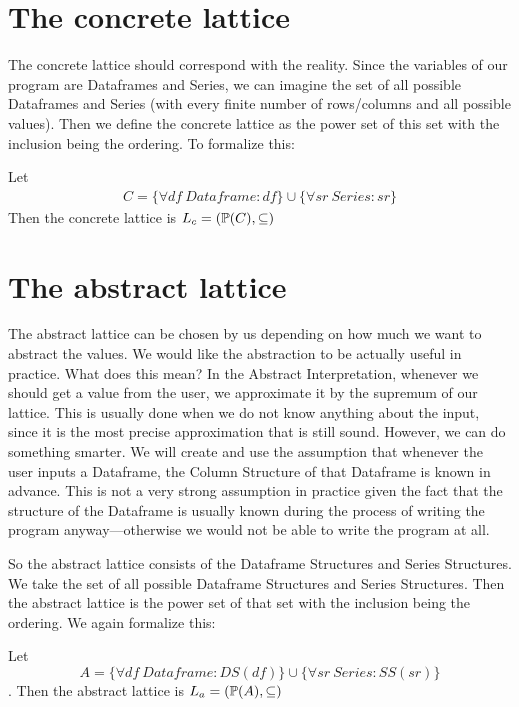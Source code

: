 \section{The concrete lattice}

The concrete lattice should correspond with the reality.
Since the variables of our program are Dataframes and Series, we can imagine the set of all possible Dataframes and
Series (with every finite number of rows/columns and all possible values).
Then we define the concrete lattice as the power set of this set with the inclusion being the ordering.
To formalize this:

\begin{defn}

    Let
    \begin{gather*}
        C = \{\forall df \: Dataframe: df\} \cup \{\forall sr \: Series: sr\}
    \end{gather*}
    Then the concrete lattice is $L_c = (\mathbb{P}(C), \subseteq)$
\end{defn}


\section{The abstract lattice}

The abstract lattice can be chosen by us depending on how much we want to abstract the values.
We would like the abstraction to be actually useful in practice.
What does this mean?
In the Abstract Interpretation, whenever we should get a value from the user, we approximate it by the supremum of our
lattice.
This is usually done when we do not know anything about the input, since it is the most precise approximation that is
still sound.
However, we can do something smarter.
We will create and use the assumption that whenever the user inputs a Dataframe, the Column Structure of that Dataframe
is known in advance.
This is not a very strong assumption in practice given the fact that the structure of the Dataframe is usually known
during the process of writing the program anyway---otherwise we would not be able to write the program at all.

So the abstract lattice consists of the Dataframe Structures and Series Structures.
We take the set of all possible Dataframe Structures and Series Structures.
Then the abstract lattice is the power set of that set with the inclusion being the ordering.
We again formalize this:

\begin{defn}

    Let
    \[A = \{\forall df\: Dataframe: DS(df)\} \cup \{\forall sr \: Series: SS(sr)\}\].
    Then the abstract lattice is $L_a = (\mathbb{P}(A), \subseteq)$
\end{defn}

